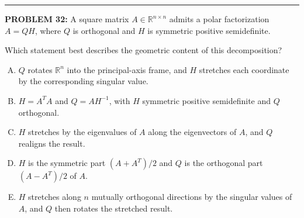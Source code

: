 \documentclass[12pt]{amsart}
\newcommand{\divider}{
  \vspace{-1em} %
  \noindent
  \raisebox{-0.15ex}{\textbullet}%
  \hspace{0.5em}%
  \rule[0.5ex]{0.95\textwidth}{1.0pt}%
  \hspace{0.5em}%
  \raisebox{-0.15ex}{\textbullet}%
  \vspace{0em} %
}
\begin{document}
\divider

{\bf PROBLEM 32:}
A square matrix $A \in \mathbb{R}^{n \times n}$ admits a polar factorization $A = QH$, where $Q$ is orthogonal and $H$ is symmetric positive semidefinite.

Which statement best describes the geometric content of this decomposition?

\begin{enumerate}[(A)]
\item $Q$ rotates $\mathbb{R}^n$ into the principal-axis frame, and $H$ stretches each coordinate by the corresponding singular value.
\item $H = A^T A$ and $Q = A H^{-1}$, with $H$ symmetric positive semidefinite and $Q$ orthogonal.
\item $H$ stretches by the eigenvalues of $A$ along the eigenvectors of $A$, and $Q$ realigns the result.
\item $H$ is the symmetric part $(A + A^T)/2$ and $Q$ is the orthogonal part $(A - A^T)/2$ of $A$.
\item $H$ stretches along $n$ mutually orthogonal directions by the singular values of $A$, and $Q$ then rotates the stretched result.
\end{enumerate}
\end{document}
